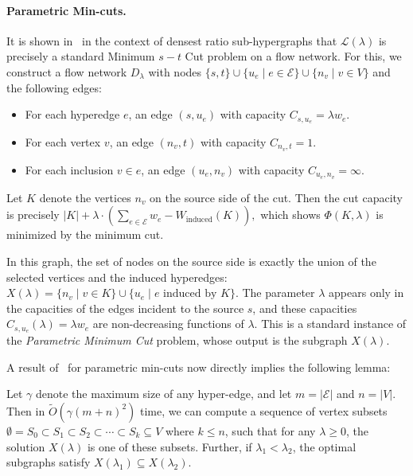 \paragraph{Parametric Min-cuts.} It is shown in~\cite{ChekuriQT} in the context of densest ratio sub-hypergraphs that $\mathcal{L}(\lambda)$ is precisely a standard Minimum $s-t$ Cut problem on a flow network. For this, we construct a flow network $D_\lambda$ with nodes $\{s, t\} \cup \{u_e \mid e \in \mathcal{E}\} \cup \{n_v \mid v \in V\}$ and the following edges: 

\begin{itemize}
    \item For each hyperedge $e$, an edge $(s, u_e)$ with capacity $C_{s, u_e} = \lambda w_e$.
    \item For each vertex $v$, an edge $(n_v, t)$ with capacity $C_{n_v, t} = 1$. 
    \item For each inclusion $v \in e$, an edge $(u_e, n_v)$ with capacity $C_{u_e, n_v} = \infty$.
\end{itemize}  

Let $K$ denote the vertices $n_v$ on the source side of the cut. Then the cut capacity is precisely
$ |K| + \lambda \cdot \left(\sum_{e \in \mathcal E}  w_e - W_{\text{induced}}(K)\right),$
which shows $\Phi(K,\lambda)$ is minimized by the minimum cut. 

In this graph, the set of nodes on the source side is exactly the union of the selected vertices and the induced hyperedges: $X(\lambda) = \{n_v \mid v \in K\} \cup \{u_e \mid e \text{ induced by } K\}$. The parameter $\lambda$ appears only in the capacities of the edges incident to the source $s$, and these capacities $C_{s, u_e}(\lambda) = \lambda w_e$ are non-decreasing functions of $\lambda$. This is a standard instance of the \textit{Parametric Minimum Cut} problem, whose output is the subgraph $X(\lambda)$.

A result of~\cite{gallo1989fast} for parametric min-cuts now directly implies the following lemma:

\begin{lemma} 
\label{lem:lag-mon}
Let $\gamma$ denote the maximum size of any hyper-edge, and let $m = |\mathcal E|$ and $n = |V|$. Then in $\tilde{O}(\gamma (m+n)^2)$ time, we can compute a sequence of vertex subsets $\emptyset = S_0 \subset S_1 \subset S_2 \subset \cdots \subset S_k \subseteq V$ where $k \le n$, such that for any $\lambda \ge 0$, the solution $X(\lambda)$ is one of these subsets. Further, if $\lambda_1 < \lambda_2$, the optimal subgraphs satisfy $X(\lambda_1) \subseteq X(\lambda_2)$.
\end{lemma}

